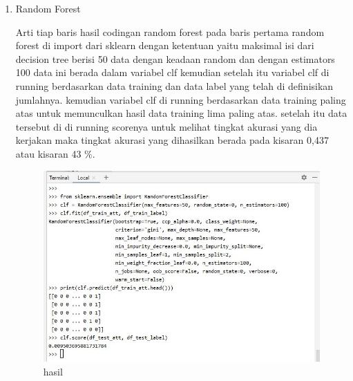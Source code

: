 \begin{enumerate}
\item Random Forest\par
Arti tiap baris hasil codingan random forest pada baris pertama random forest di import dari sklearn dengan ketentuan yaitu maksimal isi dari decision tree berisi 50 data dengan keadaan random dan dengan estimators 100 data ini berada dalam variabel clf kemudian setelah itu variabel clf di running berdasarkan data training dan data label yang telah di definisikan jumlahnya. kemudian variabel clf di running berdasarkan data training paling atas untuk memunculkan hasil data training lima paling atas. setelah itu data tersebut di di running scorenya untuk melihat tingkat akurasi yang dia kerjakan maka tingkat akurasi yang dihasilkan berada pada kisaran 0,437 atau kisaran 43 \%.

\begin{figure}[ht]
\centering
\includegraphics[scale=0.5]{figures/1174042/chapter3/2,4.JPG}
\caption{hasil}
\label{contoh}
\end{figure}


\end{enumerate}
